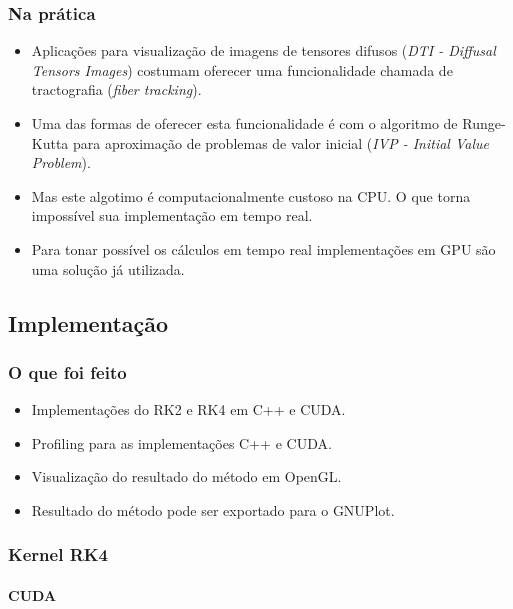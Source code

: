 \documentclass[brazil, 10pt]{beamer}
\begin{document}
\begin{frame}
  \frametitle{Na prática}
  
  \begin{itemize}
    \item Aplicações para visualização de imagens de tensores difusos (\textit{DTI - Diffusal Tensors Images}) costumam oferecer uma funcionalidade chamada de tractografia (\textit{fiber tracking}).
    \item Uma das formas de oferecer esta funcionalidade é com o algoritmo de Runge-Kutta para aproximação de problemas de valor inicial (\textit{IVP - Initial Value Problem}).
    \item Mas este algotimo é computacionalmente custoso na CPU. O que torna impossível sua implementação em tempo real.
    \item Para tonar possível os cálculos em tempo real implementações em GPU são uma solução já utilizada. 
  \end{itemize}
  
\end{frame}

\subsection{Implementação}
\begin{frame}
  \frametitle{O que foi feito}

  \begin{itemize}
    \item Implementações do RK2 e RK4 em C++ e CUDA.
    \item Profiling para as implementações C++ e CUDA.
    \item Visualização do resultado do método em OpenGL.
    \item Resultado do método pode ser exportado para o GNUPlot.
  \end{itemize}
\end{frame}

\begin{frame}
  \frametitle{Kernel RK4}
  \framesubtitle{CUDA}
  
  
\end{frame}
\end{document}
